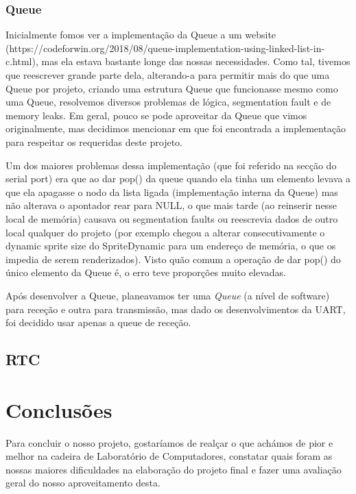 \documentclass{report}
\begin{document}
\subsection{Queue}

Inicialmente fomos ver a implementação da Queue a um website (https://codeforwin.org/2018/08/queue-implementation-using-linked-list-in-c.html), mas ela estava bastante longe das nossas necessidades. Como tal, tivemos que reescrever grande parte dela, alterando-a para permitir mais do que uma Queue por projeto, criando uma estrutura Queue que funcionasse mesmo como uma Queue, resolvemos diversos problemas de lógica, segmentation fault e de memory leaks. Em geral, pouco se pode aproveitar da Queue que vimos originalmente, mas decidimos mencionar em que foi encontrada a implementação para respeitar os requeridas deste projeto.

Um dos maiores problemas dessa implementação (que foi referido na secção do serial port) era que ao dar pop() da queue quando ela tinha um elemento levava a que ela apagasse o nodo da lista ligada (implementação interna da Queue) mas não alterava o apontador rear para NULL, o que mais tarde (ao reinserir nesse local de memória) causava ou segmentation faults ou reescrevia dados de outro local qualquer do projeto (por exemplo chegou a alterar consecutivamente o dynamic sprite size do SpriteDynamic para um endereço de memória, o que os impedia de serem renderizados). Visto quão comum a operação de dar pop() do único elemento da Queue é, o erro teve proporções muito elevadas.

Após desenvolver a Queue, planeavamos ter uma \textit{Queue} (a nível de software) para receção e outra para transmissão, mas dado os desenvolvimentos da UART, foi decidido usar apenas a queue de receção.

\section{RTC}

\chapter{Conclusões}

Para concluir o nosso projeto, gostaríamos de realçar o que achámos de pior e melhor na cadeira de Laboratório de Computadores, constatar quais foram as nossas maiores dificuldades na elaboração do projeto final e fazer uma avaliação geral do nosso aproveitamento desta.
\end{document}
